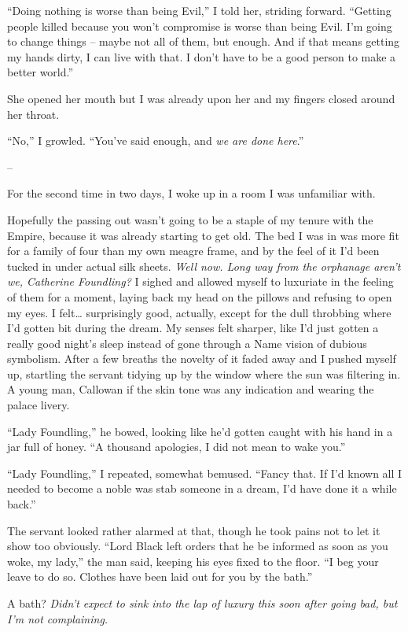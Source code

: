 \documentclass[12pt, openany]{book}
\begin{document}
“Doing nothing is worse than being Evil,” I told her, striding forward. “Getting people killed because you won’t compromise is worse than being Evil. I’m going to change things – maybe not all of them, but enough. And if that means getting my hands dirty, I can live with that. I don’t have to be a good person to make a better world.”

She opened her mouth but I was already upon her and my fingers closed around her throat.

“No,” I growled. “You’ve said enough, and \textit{we are done here}.”

–

For the second time in two days, I woke up in a room I was unfamiliar with.

Hopefully the passing out wasn’t going to be a staple of my tenure with the Empire, because it was already starting to get old. The bed I was in was more fit for a family of four than my own meagre frame, and by the feel of it I’d been tucked in under actual silk sheets. \textit{Well now. Long way from the orphanage aren’t we, Catherine Foundling?} I sighed and allowed myself to luxuriate in the feeling of them for a moment, laying back my head on the pillows and refusing to open my eyes. I felt… surprisingly good, actually, except for the dull throbbing where I’d gotten bit during the dream. My senses felt sharper, like I’d just gotten a really good night’s sleep instead of gone through a Name vision of dubious symbolism. After a few breaths the novelty of it faded away and I pushed myself up, startling the servant tidying up by the window where the sun was filtering in. A young man, Callowan if the skin tone was any indication and wearing the palace livery.

“Lady Foundling,” he bowed, looking like he’d gotten caught with his hand in a jar full of honey. “A thousand apologies, I did not mean to wake you.”

“Lady Foundling,” I repeated, somewhat bemused. “Fancy that. If I’d known all I needed to become a noble was stab someone in a dream, I’d have done it a while back.”

The servant looked rather alarmed at that, though he took pains not to let it show too obviously. “Lord Black left orders that he be informed as soon as you woke, my lady,” the man said, keeping his eyes fixed to the floor. “I beg your leave to do so. Clothes have been laid out for you by the bath.”

A bath? \textit{Didn’t expect to sink into the lap of luxury this soon after going bad, but I’m not complaining.}
\end{document}
